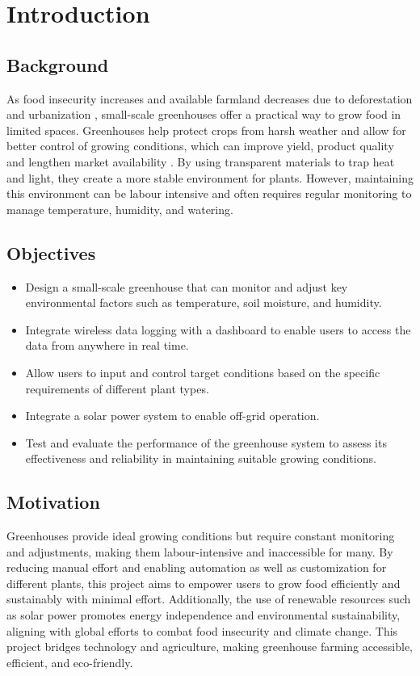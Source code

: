\chapter{Introduction}

\section{Background}
As food insecurity increases and available farmland decreases due to deforestation and urbanization \citep{Olagunju2015}, small-scale greenhouses offer a practical way to grow food in limited spaces. Greenhouses help protect crops from harsh weather and allow for better control of growing conditions, which can improve yield, product quality and lengthen market availability \citep{vox}. By using transparent materials to trap heat and light, they create a more stable environment for plants. However, maintaining this environment can be labour intensive and often requires regular monitoring to manage temperature, humidity, and watering.

\section{Objectives}

\begin{itemize}
    \item Design a small-scale greenhouse that can monitor and adjust key environmental factors such as temperature, soil moisture, and humidity.
    \item Integrate wireless data logging with a dashboard to enable users to access the data from anywhere in real time.
    \item Allow users to input and control target conditions based on the specific requirements of different plant types.
    \item Integrate a solar power system to enable off-grid operation.
    \item Test and evaluate the performance of the greenhouse system to assess its effectiveness and reliability in maintaining suitable growing conditions.
\end{itemize}

\section{Motivation}

Greenhouses provide ideal growing conditions but require constant monitoring and adjustments, making them labour-intensive and inaccessible for many. By reducing manual effort and enabling automation as well as customization for different plants, this project aims to empower users to grow food efficiently and sustainably with minimal effort. Additionally, the use of renewable resources such as solar power promotes energy independence and environmental sustainability, aligning with global efforts to combat food insecurity and climate change. This project bridges technology and agriculture, making greenhouse farming accessible, efficient, and eco-friendly.

